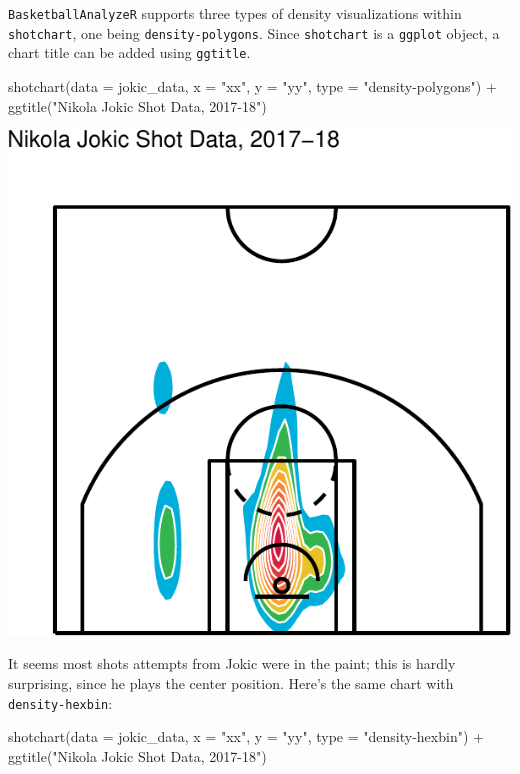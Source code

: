 \documentclass[
  11pt,
]{book}
\newenvironment{Shaded}{\begin{snugshade}}{\end{snugshade}}
\newcommand{\AttributeTok}[1]{\textcolor[rgb]{0.77,0.63,0.00}{#1}}
\newcommand{\FunctionTok}[1]{\textcolor[rgb]{0.00,0.00,0.00}{#1}}
\newcommand{\NormalTok}[1]{#1}
\newcommand{\SpecialCharTok}[1]{\textcolor[rgb]{0.00,0.00,0.00}{#1}}
\newcommand{\StringTok}[1]{\textcolor[rgb]{0.31,0.60,0.02}{#1}}
\theoremstyle{definition}
\theoremstyle{definition}
\theoremstyle{definition}
\theoremstyle{definition}
\theoremstyle{remark}
\begin{document}
\texttt{BasketballAnalyzeR} supports three types of density visualizations within \texttt{shotchart}, one being \texttt{density-polygons}. Since \texttt{shotchart} is a \texttt{ggplot} object, a chart title can be added using \texttt{ggtitle}.

\begin{Shaded}
\begin{Highlighting}[]
\FunctionTok{shotchart}\NormalTok{(}\AttributeTok{data =}\NormalTok{ jokic\_data, }\AttributeTok{x =} \StringTok{"xx"}\NormalTok{, }\AttributeTok{y =} \StringTok{"yy"}\NormalTok{, }\AttributeTok{type =} \StringTok{"density{-}polygons"}\NormalTok{) }\SpecialCharTok{+} \FunctionTok{ggtitle}\NormalTok{(}\StringTok{"Nikola Jokic Shot Data, 2017{-}18"}\NormalTok{)}
\end{Highlighting}
\end{Shaded}

\includegraphics{series_files/figure-latex/basketballanalyzer 3-1.pdf}

It seems most shots attempts from Jokic were in the paint; this is hardly surprising, since he plays the center position. Here's the same chart with \texttt{density-hexbin}:

\begin{Shaded}
\begin{Highlighting}[]
\FunctionTok{shotchart}\NormalTok{(}\AttributeTok{data =}\NormalTok{ jokic\_data, }\AttributeTok{x =} \StringTok{"xx"}\NormalTok{, }\AttributeTok{y =} \StringTok{"yy"}\NormalTok{, }\AttributeTok{type =} \StringTok{"density{-}hexbin"}\NormalTok{) }\SpecialCharTok{+} \FunctionTok{ggtitle}\NormalTok{(}\StringTok{"Nikola Jokic Shot Data, 2017{-}18"}\NormalTok{)}
\end{Highlighting}
\end{Shaded}
\end{document}
